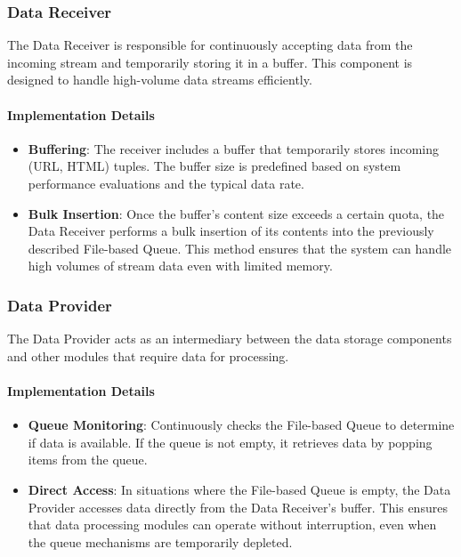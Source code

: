 \subsubsection{Data Receiver}
The Data Receiver is responsible for continuously accepting data from the incoming stream and temporarily storing it in a buffer. This component is designed to handle high-volume data streams efficiently.

\paragraph{Implementation Details}
\begin{itemize}
    \item \textbf{Buffering}: The receiver includes a buffer that temporarily stores incoming (URL, HTML) tuples. The buffer size is predefined based on system performance evaluations and the typical data rate.
    \item \textbf{Bulk Insertion}: Once the buffer's content size exceeds a certain quota, the Data Receiver performs a bulk insertion of its contents into the previously described File-based Queue. This method ensures that the system can handle high volumes of stream data even with limited memory.
\end{itemize}

\subsubsection{Data Provider}
The Data Provider acts as an intermediary between the data storage components and other modules that require data for processing.

\paragraph{Implementation Details}
\begin{itemize}
    \item \textbf{Queue Monitoring}: Continuously checks the File-based Queue to determine if data is available. If the queue is not empty, it retrieves data by popping items from the queue.
    \item \textbf{Direct Access}: In situations where the File-based Queue is empty, the Data Provider accesses data directly from the Data Receiver's buffer. This ensures that data processing modules can operate without interruption, even when the queue mechanisms are temporarily depleted.
\end{itemize}

